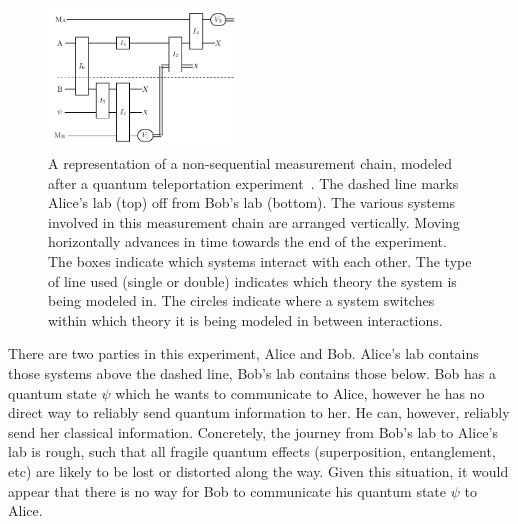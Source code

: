 \documentclass[12pt,prd,superscriptaddress,floatfix,amsmath,amssymb,amsfonts,nofootinbib]{revtex4-2}
\begin{document}
\begin{figure}
\includegraphics[width=0.45\textwidth]{Figures/TeleportationChain.pdf}
\caption{A representation of a non-sequential measurement chain, modeled after a quantum teleportation experiment~\cite{Nielsen2000}. The dashed line marks Alice's lab (top) off from Bob's lab (bottom). The various systems involved in this measurement chain are arranged vertically. Moving horizontally advances in time towards the end of the experiment. The boxes indicate which systems interact with each other. The type of line used (single or double) indicates which theory the system is being modeled in. The circles indicate where a system switches within which theory it is being modeled in between interactions.}\label{FigChain2}
\end{figure}

There are two parties in this experiment, Alice and Bob. Alice's lab contains those systems above the dashed line, Bob's lab contains those below. Bob has a quantum state $\psi$ which he wants to communicate to Alice, however he has no direct way to reliably send quantum information to her. He can, however, reliably send her classical information. Concretely, the journey from Bob's lab to Alice's lab is rough, such that all fragile quantum effects (superposition, entanglement, etc) are likely to be lost or distorted along the way. Given this situation, it would appear that there is no way for Bob to communicate his quantum state $\psi$ to Alice.
\end{document}
